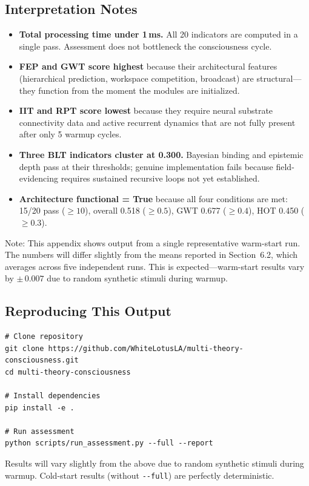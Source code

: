 \subsection{Interpretation Notes}

\begin{itemize}
  \item \textbf{Total processing time under 1\,ms.} All 20 indicators are computed in a single pass. Assessment does not bottleneck the consciousness cycle.
  \item \textbf{FEP and GWT score highest} because their architectural features (hierarchical prediction, workspace competition, broadcast) are structural---they function from the moment the modules are initialized.
  \item \textbf{IIT and RPT score lowest} because they require neural substrate connectivity data and active recurrent dynamics that are not fully present after only 5 warmup cycles.
  \item \textbf{Three BLT indicators cluster at 0.300.} Bayesian binding and epistemic depth pass at their thresholds; genuine implementation fails because field-evidencing requires sustained recursive loops not yet established.
  \item \textbf{Architecture functional = True} because all four conditions are met: 15/20 pass ($\geq 10$), overall 0.518 ($\geq 0.5$), GWT 0.677 ($\geq 0.4$), HOT 0.450 ($\geq 0.3$).
\end{itemize}

Note: This appendix shows output from a single representative warm-start run.
The numbers will differ slightly from the means reported in Section~6.2, which averages across five independent runs.
This is expected---warm-start results vary by $\pm\,0.007$ due to random synthetic stimuli during warmup.

\subsection{Reproducing This Output}

\begin{lstlisting}[language={}]
# Clone repository
git clone https://github.com/WhiteLotusLA/multi-theory-consciousness.git
cd multi-theory-consciousness

# Install dependencies
pip install -e .

# Run assessment
python scripts/run_assessment.py --full --report
\end{lstlisting}

Results will vary slightly from the above due to random synthetic stimuli during warmup.
Cold-start results (without \texttt{-{}-full}) are perfectly deterministic.
